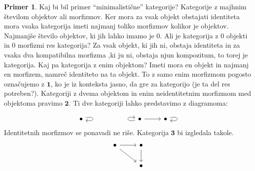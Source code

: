 \documentclass[12pt,a4paper]{book}
\theoremstyle{definition}
\theoremstyle{plain}
\theoremstyle{definition}
\newtheorem{primer}{Primer}[section]
\theoremstyle{remark}
\newcommand{\cat}[1]{\textbf{#1}}
\begin{document}
\begin{primer}
Kaj bi bil primer "`minimalistične"' kategorije? Kategorije z majhnim številom objektov ali morfizmov. Ker mora za vsak objekt obstajati identiteta mora vsaka kategorija imeti najmanj toliko morfizmov kolikor je objektov. Najmanjše število objektov, ki jih lahko imamo je 0. Ali je kategorija z 0 objekti in 0 morfizmi res kategorija? Za vsak objekt, ki jih ni, obstaja identiteta in za vsaka dva kompatibilna morfizma ,ki ju ni, obstaja njun kompozitum, to torej je kategorija. Kaj pa kategorija z enim objektom? Imeti mora en objekt in najmanj en morfizem, namreč identiteto na ta objekt. To z samo enim morfizmom pogosto označujemo z $\mathbf{1}$, ko je iz konteksta jasno, da gre za kategorijo (je ta del res potreben?). Kategoriji z dvema objektom in enim neidentitetnim morfizmom med objektoma pravimo $\mathbf{2}$. Ti dve kategoriji lahko predstavimo z diagramoma:

\begin{equation}
\begin{tikzcd}
\bullet \arrow[loop right] &&&  \arrow[loop left] \bullet \arrow[r] & \bullet \arrow[loop right]
\end{tikzcd}
\end{equation}
%
Identitetnih morfizmov se ponavadi ne riše. Kategorija $\cat{3}$ bi izgledala takole.
%
\begin{equation}
\begin{tikzcd}
\bullet \arrow[r] \arrow[rd] & \bullet \arrow[d] \\
& \bullet
\end{tikzcd}
\end{equation}
\end{primer}
\end{document}
